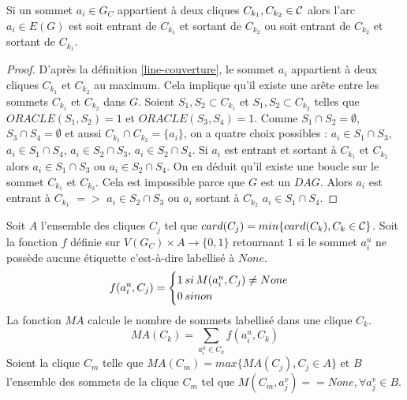 \begin{theorem}
\label{arcsentrantsSortants}
Si un sommet $a_i \in G_C$ appartient \`a deux cliques $C_{k_1}, C_{k_2} \in {\cal C}$ alors 
l'arc  $a_i \in E(G)$ est soit entrant de $C_{k_1}$  et sortant de $C_{k_2}$ ou soit entrant de $C_{k_2}$  et sortant de $C_{k_1}$.
\end{theorem}

\begin{proof}
D'apr\`es la d\'efinition \ref{line-couverture}, le sommet $a_i$ appartient \`a deux cliques $C_{k_1}$ et $C_{k_2}$ au maximum. 
Cela implique qu'il existe une ar\^ete entre les sommets $C_{k_1}$ et $C_{k_2}$ dans $G$.
Soient $S_1, S_2 \subset C_{k_1}$ et $S_1, S_2 \subset C_{k_2}$ telles que $ORACLE(S_1, S_2) = 1$ et $ORACLE(S_3, S_4) = 1$.
Comme  $S_1 \cap S_2 = \emptyset$, $S_3 \cap S_4 = \emptyset$ et aussi  $C_{k_1} \cap C_{k_2} = \{a_i\}$, on a quatre choix possibles :
$a_i \in S_1 \cap S_3$, $a_i \in S_1 \cap S_4$, $a_i \in S_2 \cap S_3$, $a_i \in S_2 \cap S_4$.
\newline
Si $a_i$ est entrant et sortant \`a $C_{k_1}$ et $C_{k_2}$ alors $a_i \in S_1 \cap S_3$ ou  $a_i \in S_2 \cap S_4$. 
On en d\'eduit qu'il existe une boucle sur le sommet $C_{k_1}$ et $C_{k_2}$. 
Cela est impossible parce que $G$ est un $DAG$. 
\newline
Alors $a_i$ est entrant \`a $C_{k_1}$ $=>$ $a_i \in S_2 \cap S_3$ ou  $a_i$ sortant \`a $C_{k_2}$  $a_i \in S_1 \cap S_4$. 
\end{proof}

Soit $A$ l'ensemble des cliques $C_j$ tel que $card(C_j) = min\{ card(C_k), C_k \in {\cal C}\}$.
\newline
Soit la fonction $f$ d\'efinie sur $ V(G_C) \times A \rightarrow \{0,1\}$ retournant $1$ si le sommet $a_i^u$ ne poss\`ede aucune \'etiquette c'est-\`a-dire labellis\'e \`a $None$.
$$ f(a_i^u, C_j) = \begin{cases} 1 \hspace{0.2 em} si \hspace{0.2 em} M(a_i^u, C_j) \ne None \\ 0 \hspace{0.2 em} sinon \end{cases}$$
La fonction $MA$ calcule le nombre de sommets labellis\'e dans une clique $C_k$.
$$MA(C_k) =  \sum_{a_i^u \in C_k} f(a_i^u,C_k) $$
Soient la clique $C_m$ telle que  $MA(C_m) = max\{ MA(C_j), C_j \in A\}$ et $B$ l'ensemble des sommets de la clique $C_m$ tel que $M(C_m, a_j^v) == None, \forall a_j^v \in B$. 


